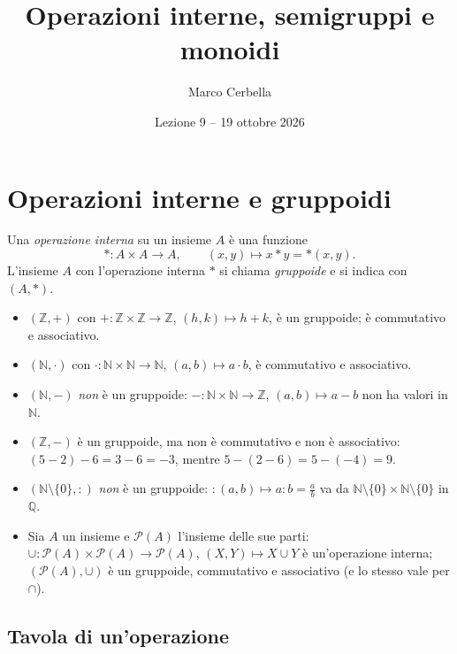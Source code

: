 \documentclass[11pt,a4paper]{article}
\title{Operazioni interne, semigruppi e monoidi}
\author{Marco Cerbella}
\date{Lezione 9 -- 19 ottobre 2026}
\begin{document}
\maketitle

\section{Operazioni interne e gruppoidi}

\begin{definizione}
Una \emph{operazione interna} su un insieme $A$ è una funzione
\[
  * : A \times A \to A, \qquad (x, y) \mapsto x * y = {*}(x, y).
\]
L'insieme $A$ con l'operazione interna $*$ si chiama \emph{gruppoide} e si indica con $(A, *)$.
\end{definizione}

\begin{esempio}
\begin{itemize}
  \item $(\mathbb{Z}, +)$ con $+ : \mathbb{Z}\times\mathbb{Z} \to \mathbb{Z}$, $(h, k) \mapsto h + k$, è un gruppoide; è commutativo e associativo.
  \item $(\mathbb{N}, \cdot)$ con $\cdot : \mathbb{N}\times\mathbb{N} \to \mathbb{N}$, $(a, b) \mapsto a\cdot b$, è commutativo e associativo.
  \item $(\mathbb{N}, -)$ \emph{non} è un gruppoide: $-: \mathbb{N}\times\mathbb{N} \to \mathbb{Z}$, $(a, b) \mapsto a - b$ non ha valori in $\mathbb{N}$.
  \item $(\mathbb{Z}, -)$ è un gruppoide, ma non è commutativo e non è associativo: $(5-2)-6 = 3 - 6 = -3$, mentre $5 - (2 - 6) = 5 - (-4) = 9$.
  \item $(\mathbb{N}\setminus\{0\}, :)$ \emph{non} è un gruppoide: $: (a, b) \mapsto a : b = \frac{a}{b}$ va da $\mathbb{N}\setminus\{0\} \times \mathbb{N}\setminus\{0\}$ in $\mathbb{Q}$.
  \item Sia $A$ un insieme e $\mathcal{P}(A)$ l'insieme delle sue parti: $\cup : \mathcal{P}(A)\times\mathcal{P}(A) \to \mathcal{P}(A)$, $(X, Y) \mapsto X \cup Y$ è un'operazione interna; $(\mathcal{P}(A), \cup)$ è un gruppoide, commutativo e associativo (e lo stesso vale per $\cap$).
\end{itemize}
\end{esempio}

\subsection{Tavola di un'operazione}
\end{document}

